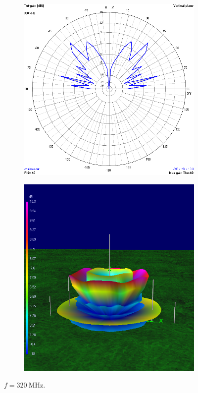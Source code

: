 \begin{figure}[H]
	\begin{subfigure}{0.5\textwidth}
		\includegraphics[scale=0.43]{imagenes/2D_320MHz_tierra.png}
	\end{subfigure}	
	\quad
	\begin{subfigure}{0.5\textwidth}
		\includegraphics[scale=0.43]{imagenes/3D_320MHz_tierra.png}
	\end{subfigure}
	\caption{$f=\SI{320}{\mega\hertz}$.}
	\label{fig.radiacion_320M_tierra}
\end{figure}


